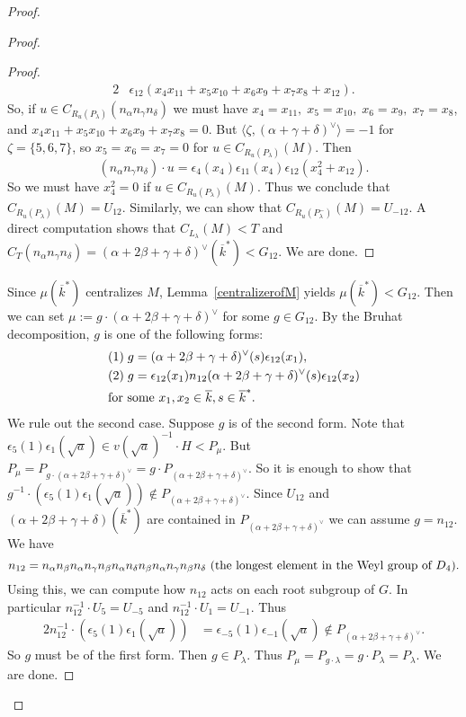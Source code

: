 \begin{proof}
\begin{proof}
\begin{proof}
\begin{alignat*}{2}
&\epsilon_{12}(x_4 x_{11}+x_5 x_{10} +x_6 x_9+ x_7 x_8+ x_{12}). 
\end{alignat*}
So, if $u\in C_{R_u(P_\lambda)}(n_\alpha n_\gamma n_\delta)$ we must have
$x_4=x_{11}, \; x_5=x_{10},\; x_{6}=x_{9},\; x_7=x_8$, and $x_4 x_{11}+x_5 x_{10} +x_6 x_9+ x_7 x_8=0$. But $\langle \zeta, (\alpha+\gamma+\delta)^{\vee}\rangle=-1$ for $\zeta=\{5, 6, 7\}$, so $x_5=x_6=x_7=0$ for $u\in C_{R_u(P_\lambda)}(M)$. Then 
\begin{equation*}
(n_\alpha n_\gamma n_\delta)\cdot u = \epsilon_4(x_4)\epsilon_{11}(x_4)\epsilon_{12}(x_4^2+x_{12}).
\end{equation*}
So we must have $x_4^2=0$ if $u\in C_{R_u(P_\lambda)}(M)$. Thus we conclude that $C_{R_u(P_\lambda)}(M)=U_{12}$. Similarly, we can show that $C_{R_u(P_{\lambda}^{-})}(M)=U_{-12}$. A direct computation shows that $C_{L_\lambda}(M) < T$ and $C_T(n_\alpha n_\gamma n_\delta)=(\alpha+2\beta+\gamma+\delta)^{\vee}(\overline k^*)<G_{12}$. We are done.
\end{proof}
Since $\mu(\overline k^*)$ centralizes $M$, Lemma~\ref{centralizerofM} yields $\mu(\overline k^*)<G_{12}$. Then we can set $\mu:=g\cdot (\alpha+2\beta+\gamma+\delta)^{\vee}$ for some $g\in G_{12}$. By the Bruhat decomposition, $g$ is one of the following forms:
\begin{alignat*}{2}
&(1)\;g=(\alpha+2\beta+\gamma+\delta)^{\vee}(s)\epsilon_{12}(x_1),\\
&(2)\;g=\epsilon_{12}(x_1)n_{12}(\alpha+2\beta+\gamma+\delta)^{\vee}(s)\epsilon_{12}(x_2)\\
&\textup{for some } x_1, x_2\in \overline k, s\in \overline k^*.
\end{alignat*}
We rule out the second case. Suppose $g$ is of the second form. Note that $\epsilon_{5}(1)\epsilon_{1}(\sqrt a)\in v(\sqrt a)^{-1}\cdot H< P_\mu$. 
But $P_\mu=P_{g\cdot (\alpha+2\beta+\gamma+\delta)^{\vee}}=g\cdot P_{(\alpha+2\beta+\gamma+\delta)^{\vee}}$. So it is enough to show that $g^{-1}\cdot (\epsilon_{5}(1)\epsilon_{1}(\sqrt a))\notin P_{(\alpha+2\beta+\gamma+\delta)^{\vee}}$. Since $U_{12}$ and $(\alpha+2\beta+\gamma+\delta)(\overline k^*)$ are contained in $P_{(\alpha+2\beta+\gamma+\delta)^{\vee}}$ we can assume $g=n_{12}$. We have
\begin{equation*}
n_{12}=n_\alpha n_\beta n_\alpha n_\gamma n_\beta n_\alpha n_\delta n_\beta n_\alpha n_\gamma n_\beta n_\delta \textup{ (the longest element in the Weyl group of $D_4$)}.
\end{equation*}
Using this, we can compute how $n_{12}$ acts on each root subgroup of $G$. In particular $n_{12}^{-1}\cdot U_{5}=U_{-5}$ and $n_{12}^{-1}\cdot U_{1}= U_{-1}$. Thus
\begin{alignat*}{2}
n_{12}^{-1}\cdot (\epsilon_{5}(1)\epsilon_{1}(\sqrt a)) &= \epsilon_{-5}(1)\epsilon_{-1}(\sqrt a)\notin P_{(\alpha+2\beta+\gamma+\delta)^{\vee}}.
\end{alignat*}
So $g$ must be of the first form. Then $g\in P_\lambda$. Thus $P_\mu=P_{g\cdot \lambda}=g\cdot P_\lambda=P_\lambda$. We are done.
\end{proof}


\end{proof}
